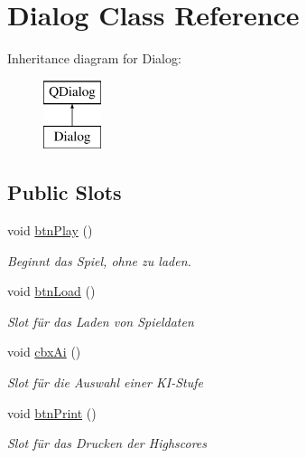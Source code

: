 \hypertarget{class_dialog}{\section{Dialog Class Reference}
\label{class_dialog}
}
Inheritance diagram for Dialog\-:\begin{figure}[H]
\begin{center}
\leavevmode
\includegraphics[height=2.000000cm]{class_dialog}
\end{center}
\end{figure}
\subsection*{Public Slots}
\begin{DoxyCompactItemize}
\item 
void \hyperlink{class_dialog_a457f4804c42085dbb16bfb31c706a40f}{btn\-Play} ()
\begin{DoxyCompactList}\small\item\em Beginnt das Spiel, ohne zu laden. \end{DoxyCompactList}\item 
void \hyperlink{class_dialog_a419f7ab4d550b95154425e0cbe350cb5}{btn\-Load} ()
\begin{DoxyCompactList}\small\item\em Slot für das Laden von Spieldaten \end{DoxyCompactList}\item 
void \hyperlink{class_dialog_a75d078be0df9c62228d85ea8c5dabd5c}{cbx\-Ai} ()
\begin{DoxyCompactList}\small\item\em Slot für die Auswahl einer K\-I-\/\-Stufe \end{DoxyCompactList}\item 
void \hyperlink{class_dialog_a3c381c2667b6b17af6010a581995c593}{btn\-Print} ()
\begin{DoxyCompactList}\small\item\em Slot für das Drucken der Highscores \end{DoxyCompactList}\end{DoxyCompactItemize}

